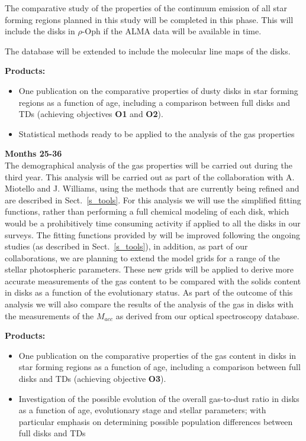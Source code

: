 \documentclass[10pt,fleqn,twoside]{article}
\begin{document}
The comparative study of the properties of the continuum emission of all star forming regions planned in this study will be completed in this phase. This will include the disks in $\rho$-Oph if the ALMA data will be available in time. 

The database will be extended to include the molecular line maps of the disks.
 
\smallskip
{\bf Products:} 
\begin{itemize}
\item One publication on the comparative properties of dusty disks in star forming regions as a function of age, including a comparison between full disks and TDs (achieving objectives {\bf O1} and {\bf O2}).
\item Statistical methods ready to be applied to the analysis of the gas properties
\end{itemize}

{\Tcol\bf Months 25-36}\\

The demographical analysis of the gas properties will be carried out during the third year. This analysis will be carried out as part of the collaboration with A. Miotello and J. Williams, using the methods that are currently being refined and are described in Sect.~\ref{s_tools}. For this analysis we will use the simplified fitting functions, rather than performing a full chemical modeling of each disk, which would be a prohibitively time consuming activity if applied to all the disks in our surveys. The fitting functions provided by \citet{2016A&A...594A..85M} will be improved following the ongoing studies (as described in Sect.~\ref{s_tools}), in addition, as part of our collaborations, we are planning to extend the model grids for a range of the stellar photospheric parameters. These new grids will be applied to derive more accurate measurements of the gas content to be compared with the solids content in disks as a function of the evolutionary status. As part of the outcome of this analysis we will also compare the results of the 
analysis of the gas in disks with the measurements of the $M_{acc}$ as derived from our optical spectroscopy database.

\smallskip
{\bf Products:} 
\begin{itemize}
\item One publication on the comparative properties of the gas content in disks in star forming regions as a function of age, including a comparison between full disks and TDs (achieving objective {\bf O3}).
\item Investigation of the possible evolution of the overall gas-to-dust ratio in disks as a function of age, evolutionary stage and stellar parameters; with particular emphasis on determining possible population differences between full disks and TDs
\end{itemize}
\end{document}
